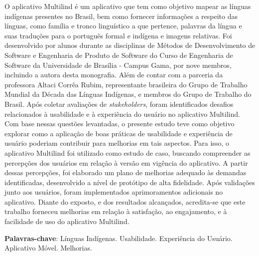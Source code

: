 \begin{resumo}
    O aplicativo Multilind é um aplicativo que tem como objetivo mapear as línguas indígenas presentes no Brasil, bem como fornecer informações a respeito das línguas, como família e tronco linguístico a que pertence, palavras 
    da língua e suas traduções para o português formal e indígena e imagens relativas. Foi desenvolvido por alunos durante as disciplinas de Métodos de Desenvolvimento de Software e Engenharia de Produto de Software do
    Curso de Engenharia de Software da Universidade de Brasília - Campus Gama, por nove membros, incluindo a autora desta monografia. Além de contar com a parceria 
    da professora Altaci Corrêa Rubim, representante brasileira do Grupo de Trabalho Mundial da Década das Línguas Indígenas, e membros do Grupo de Trabalho do Brasil. Após coletar avaliações de \textit{stakeholders}, foram identificados 
    desafios relacionados à usabilidade e à experiência do usuário no aplicativo Multilind. Com base nessas questões levantadas, o presente estudo teve como objetivo explorar como a aplicação de boas práticas de usabilidade e experiência 
    de usuário poderiam contribuir para melhorias em tais aspectos. Para isso, o aplicativo Multilind foi utilizado como estudo de caso, buscando compreender as percepções dos usuários em relação à versão em vigência do aplicativo. A partir dessas 
    percepções, foi elaborado um plano de melhorias adequado às demandas identificadas, desenvolvido a nível de protótipo de alta fidelidade. Após validações junto aos usuários, foram 
    implementados aprimoramentos adicionais no aplicativo. Diante do exposto, e dos resultados alcançados, acredita-se que este trabalho forneceu melhorias em relação à satisfação, ao engajamento, e à facilidade de uso do aplicativo Multilind.
    
 \vspace{\onelineskip}
    
 \noindent
 \textbf{Palavras-chave}: Línguas Indígenas. Usabilidade. Experiência do Usuário. Aplicativo Móvel. Melhorias.
\end{resumo}

